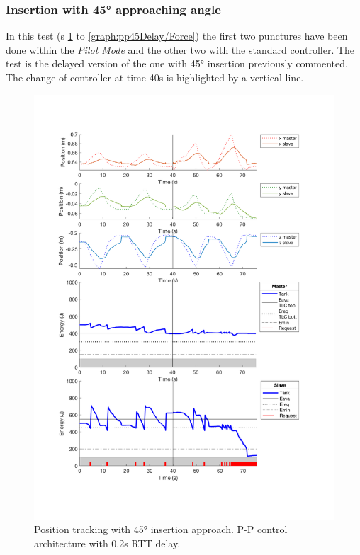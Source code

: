 \subsubsection{Insertion with 45° approaching angle}
In this test (\figurename s{ \ref{graph:pp45Delay/Position} to \ref{graph:pp45Delay/Force}}) the first two punctures have been done within the \textit{Pilot Mode} and the other two with the standard controller.
The test is the delayed version of the one with 45° insertion previously commented.
The change of controller at time 40s is highlighted by a vertical line.
\begin{center}
	\begin{figure}
		\includegraphics[width=\textwidth, keepaspectratio]{plots/pp45Delay/Position.pdf}
		\caption{Position tracking with 45° insertion approach. P-P control architecture with 0.2s RTT delay.}
		\label{graph:pp45Delay/Position}
	\end{figure}
\end{center}
